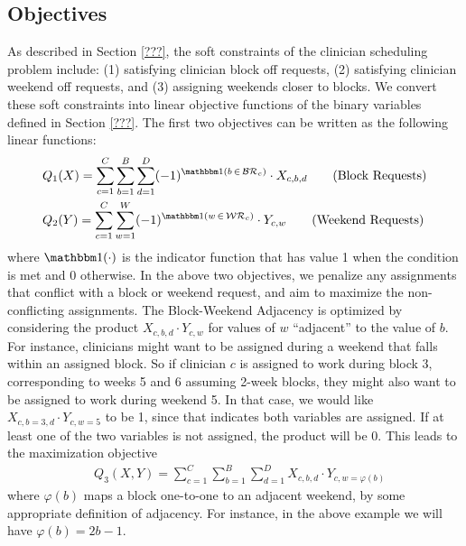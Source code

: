 \subsection{Objectives}
As described in Section \ref{???}, the soft constraints of the clinician scheduling problem include: (1) satisfying clinician block off requests, (2) satisfying clinician weekend off requests, and (3) assigning weekends closer to blocks. We convert these soft constraints into linear objective functions of the binary variables defined in Section \ref{???}. The first two objectives can be written as the following linear functions:  %
\begin{align}
	&Q_1(X) = \sum_{c=1}^{C} \sum_{b=1}^{B} \sum_{d=1}^{D} (-1)^{\ind(b\,\in\,\mathcal{BR}_c)}\cdot X_{c, b, d} \tag{Block Requests} \label{eqn:obj-block-requests}\\
	&Q_2(Y) = \sum_{c=1}^{C} \sum_{w=1}^{W} (-1)^{\ind(w\,\in\,\mathcal{WR}_c)}\cdot Y_{c, w} \tag{Weekend Requests} \label{eqn:obj-weekend-requests}
\end{align}
where $\ind(\cdot)$ is the indicator function that has value 1 when the condition is met and 0 otherwise. In the above two objectives, we penalize any assignments that conflict with a block or weekend request, and aim to maximize the non-conflicting assignments. The Block-Weekend Adjacency is optimized by considering the product $X_{c, b, d}\cdot Y_{c, w}$ for values of $w$ ``adjacent'' to the value of $b$. For instance, clinicians might want to be assigned during a weekend that falls within an assigned block. So if clinician $c$ is assigned to work during block 3, corresponding to weeks 5 and 6 assuming 2-week blocks, they might also want to be assigned to work during weekend 5. In that case, we would like $X_{c, b=3, d} \cdot Y_{c, w=5}$ to be 1, since that indicates both variables are assigned. If at least one of the two variables is not assigned, the product will be 0. This leads to the maximization objective  %
\begin{align}
	&Q_3(X, Y) = \sum_{c=1}^{C} \sum_{b=1}^{B} \sum_{d=1}^{D} X_{c, b, d}\cdot Y_{c, w=\varphi(b)} \tag{Block-Weekend Adjacency} \label{eqn:obj-block-weekend-adj}
\end{align}
where $\varphi(b)$ maps a block one-to-one to an adjacent weekend, by some appropriate definition of adjacency. For instance, in the above example we will have $\varphi(b) = 2b - 1$. \\

